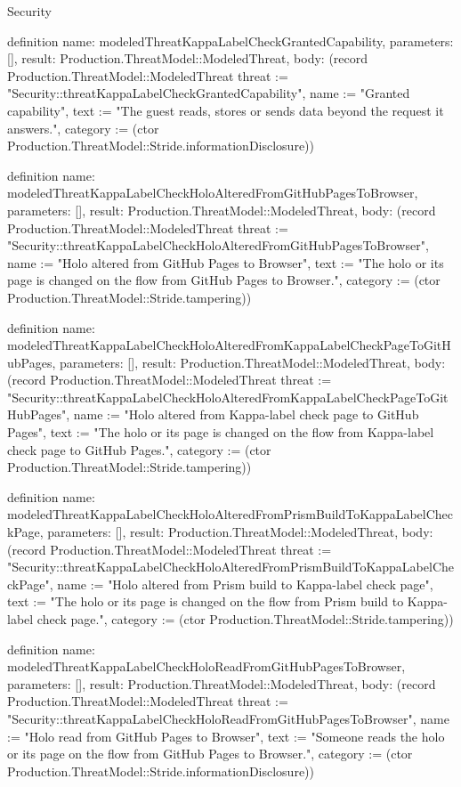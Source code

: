 \begin{lexlean}{Security}
\begin{semanticmodule}
definition{
  name: modeledThreatKappaLabelCheckGrantedCapability,
  parameters: [],
  result: Production.ThreatModel::ModeledThreat,
  body: (record Production.ThreatModel::ModeledThreat {threat := "Security::threatKappaLabelCheckGrantedCapability", name := "Granted capability", text := "The guest reads, stores or sends data beyond the request it answers.", category := (ctor Production.ThreatModel::Stride.informationDisclosure)})
}

definition{
  name: modeledThreatKappaLabelCheckHoloAlteredFromGitHubPagesToBrowser,
  parameters: [],
  result: Production.ThreatModel::ModeledThreat,
  body: (record Production.ThreatModel::ModeledThreat {threat := "Security::threatKappaLabelCheckHoloAlteredFromGitHubPagesToBrowser", name := "Holo altered from GitHub Pages to Browser", text := "The holo or its page is changed on the flow from GitHub Pages to Browser.", category := (ctor Production.ThreatModel::Stride.tampering)})
}

definition{
  name: modeledThreatKappaLabelCheckHoloAlteredFromKappaLabelCheckPageToGitHubPages,
  parameters: [],
  result: Production.ThreatModel::ModeledThreat,
  body: (record Production.ThreatModel::ModeledThreat {threat := "Security::threatKappaLabelCheckHoloAlteredFromKappaLabelCheckPageToGitHubPages", name := "Holo altered from Kappa-label check page to GitHub Pages", text := "The holo or its page is changed on the flow from Kappa-label check page to GitHub Pages.", category := (ctor Production.ThreatModel::Stride.tampering)})
}

definition{
  name: modeledThreatKappaLabelCheckHoloAlteredFromPrismBuildToKappaLabelCheckPage,
  parameters: [],
  result: Production.ThreatModel::ModeledThreat,
  body: (record Production.ThreatModel::ModeledThreat {threat := "Security::threatKappaLabelCheckHoloAlteredFromPrismBuildToKappaLabelCheckPage", name := "Holo altered from Prism build to Kappa-label check page", text := "The holo or its page is changed on the flow from Prism build to Kappa-label check page.", category := (ctor Production.ThreatModel::Stride.tampering)})
}

definition{
  name: modeledThreatKappaLabelCheckHoloReadFromGitHubPagesToBrowser,
  parameters: [],
  result: Production.ThreatModel::ModeledThreat,
  body: (record Production.ThreatModel::ModeledThreat {threat := "Security::threatKappaLabelCheckHoloReadFromGitHubPagesToBrowser", name := "Holo read from GitHub Pages to Browser", text := "Someone reads the holo or its page on the flow from GitHub Pages to Browser.", category := (ctor Production.ThreatModel::Stride.informationDisclosure)})
}


\end{semanticmodule}
\end{lexlean}
